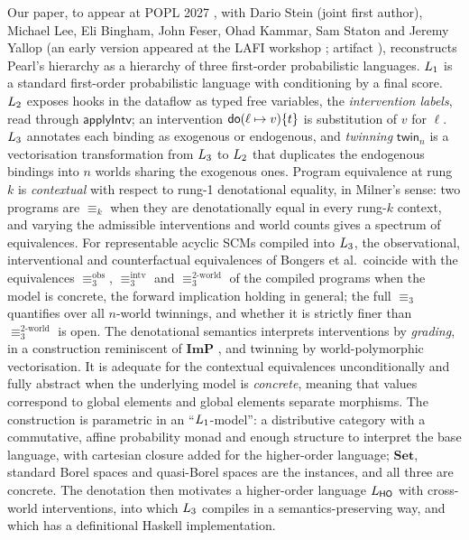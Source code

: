 Our paper, to appear at POPL 2027 \cite{wang2026causalppl}, with Dario Stein (joint first author), Michael Lee, Eli Bingham, John Feser, Ohad Kammar, Sam Staton and Jeremy Yallop (an early version appeared at the LAFI workshop \cite{lafi-wang}; artifact \cite{ARTIFACT_wang_2026_23207221}), reconstructs Pearl's hierarchy as a hierarchy of three first-order probabilistic languages. $L_{1}$ is a standard first-order probabilistic language with conditioning by a final score. $L_{2}$ exposes hooks in the dataflow as typed free variables, the \emph{intervention labels}, read through $\mathsf{applyIntv}$; an intervention $\mathsf{do}(\ell\mapsto v)\{t\}$ is substitution of $v$ for $\ell$. $L_{3}$ annotates each binding as exogenous or endogenous, and \emph{twinning} $\mathsf{twin}_n$ is a vectorisation transformation from $L_{3}$ to $L_{2}$ that duplicates the endogenous bindings into $n$ worlds sharing the exogenous ones. Program equivalence at rung $k$ is \emph{contextual} with respect to rung-1 denotational equality, in Milner's sense: two programs are $\equiv_k$ when they are denotationally equal in every rung-$k$ context, and varying the admissible interventions and world counts gives a spectrum of equivalences. For representable acyclic SCMs compiled into $L_{3}$, the observational, interventional and counterfactual equivalences of Bongers et al.\ coincide with the equivalences $\equiv_3^{\mathrm{obs}}$, $\equiv_3^{\mathrm{intv}}$ and $\equiv_3^{\text{2-world}}$ of the compiled programs when the model is concrete, the forward implication holding in general; the full $\equiv_3$ quantifies over all $n$-world twinnings, and whether it is strictly finer than $\equiv_3^{\text{2-world}}$ is open. The denotational semantics interprets interventions by \emph{grading}, in a construction reminiscent of $\mathbf{ImP}$ \cite{liell2025compositional}, and twinning by world-polymorphic vectorisation. It is adequate for the contextual equivalences unconditionally and fully abstract when the underlying model is \emph{concrete}, meaning that values correspond to global elements and global elements separate morphisms. The construction is parametric in an ``$L_{1}$-model'': a distributive category with a commutative, affine probability monad and enough structure to interpret the base language, with cartesian closure added for the higher-order language; $\mathbf{Set}$, standard Borel spaces and quasi-Borel spaces are the instances, and all three are concrete. The denotation then motivates a higher-order language $L_{\mathsf{HO}}$ with cross-world interventions, into which $L_{3}$ compiles in a semantics-preserving way, and which has a definitional Haskell implementation. 


